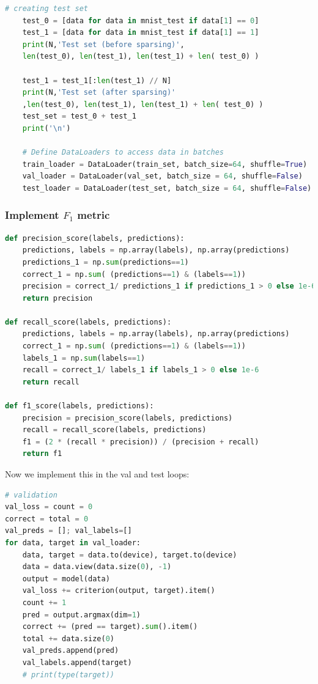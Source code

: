 \begin{solve}
\begin{lstlisting}[language=python]
    # creating test set
    test_0 = [data for data in mnist_test if data[1] == 0]
    test_1 = [data for data in mnist_test if data[1] == 1]
    print(N,'Test set (before sparsing)',
    len(test_0), len(test_1), len(test_1) + len( test_0) )

    test_1 = test_1[:len(test_1) // N]
    print(N,'Test set (after sparsing)'
    ,len(test_0), len(test_1), len(test_1) + len( test_0) )
    test_set = test_0 + test_1
    print('\n')

    # Define DataLoaders to access data in batches
    train_loader = DataLoader(train_set, batch_size=64, shuffle=True)
    val_loader = DataLoader(val_set, batch_size = 64, shuffle=False)
    test_loader = DataLoader(test_set, batch_size = 64, shuffle=False)
    \end{lstlisting}
    

    \subsubsection{Implement $F_1$ metric}


\begin{lstlisting}[language=python, title= $F_1 Function$]
def precision_score(labels, predictions):
    predictions, labels = np.array(labels), np.array(predictions)
    predictions_1 = np.sum(predictions==1)
    correct_1 = np.sum( (predictions==1) & (labels==1))
    precision = correct_1/ predictions_1 if predictions_1 > 0 else 1e-6
    return precision

def recall_score(labels, predictions):
    predictions, labels = np.array(labels), np.array(predictions)
    correct_1 = np.sum( (predictions==1) & (labels==1))
    labels_1 = np.sum(labels==1)
    recall = correct_1/ labels_1 if labels_1 > 0 else 1e-6
    return recall

def f1_score(labels, predictions):
    precision = precision_score(labels, predictions)
    recall = recall_score(labels, predictions)
    f1 = (2 * (recall * precision)) / (precision + recall)
    return f1
\end{lstlisting}

Now we implement this in the val and test loops:
\begin{lstlisting}[language=python, title= Validation Loop]
# validation
val_loss = count = 0
correct = total = 0
val_preds = []; val_labels=[]
for data, target in val_loader:
    data, target = data.to(device), target.to(device)
    data = data.view(data.size(0), -1)
    output = model(data)
    val_loss += criterion(output, target).item()
    count += 1
    pred = output.argmax(dim=1)
    correct += (pred == target).sum().item()
    total += data.size(0)
    val_preds.append(pred)
    val_labels.append(target)
    # print(type(target))


\end{lstlisting}
\end{solve}
